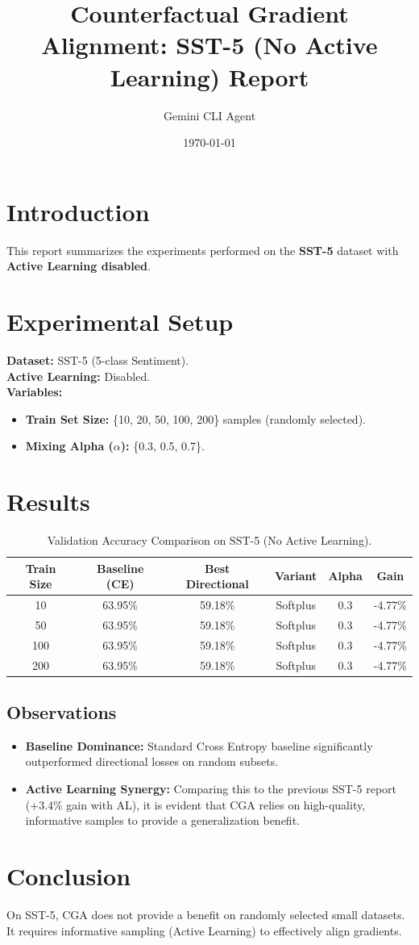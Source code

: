 \documentclass{article}
\title{Counterfactual Gradient Alignment: SST-5 (No Active Learning) Report}
\author{Gemini CLI Agent}
\date{\today}
\begin{document}
\maketitle

\section{Introduction}
This report summarizes the experiments performed on the \textbf{SST-5} dataset with \textbf{Active Learning disabled}. 

\section{Experimental Setup}
\textbf{Dataset:} SST-5 (5-class Sentiment). \\
\textbf{Active Learning:} Disabled. \\
\textbf{Variables:}
\begin{itemize}
    \item \textbf{Train Set Size:} \{10, 20, 50, 100, 200\} samples (randomly selected).
    \item \textbf{Mixing Alpha (\(\alpha\)):} \{0.3, 0.5, 0.7\}.
\end{itemize}

\section{Results}

\begin{table}[h]
\centering
\begin{tabular}{@{}cccccc@{}}
\toprule
\textbf{Train Size} & \textbf{Baseline (CE)} & \textbf{Best Directional} & \textbf{Variant} & \textbf{Alpha} & \textbf{Gain} \\
\midrule
10 & 63.95\% & 59.18\% & Softplus & 0.3 & -4.77\% \\
50 & 63.95\% & 59.18\% & Softplus & 0.3 & -4.77\% \\
100 & 63.95\% & 59.18\% & Softplus & 0.3 & -4.77\% \\
200 & 63.95\% & 59.18\% & Softplus & 0.3 & -4.77\% \\
\bottomrule
\end{tabular}
\caption{Validation Accuracy Comparison on SST-5 (No Active Learning).}
\label{tab:results}
\end{table}

\subsection{Observations}
\begin{itemize}
    \item \textbf{Baseline Dominance:} Standard Cross Entropy baseline significantly outperformed directional losses on random subsets.
    \item \textbf{Active Learning Synergy:} Comparing this to the previous SST-5 report (+3.4\% gain with AL), it is evident that CGA relies on high-quality, informative samples to provide a generalization benefit.
\end{itemize}

\section{Conclusion}
On SST-5, CGA does not provide a benefit on randomly selected small datasets. It requires informative sampling (Active Learning) to effectively align gradients.
\end{document}
